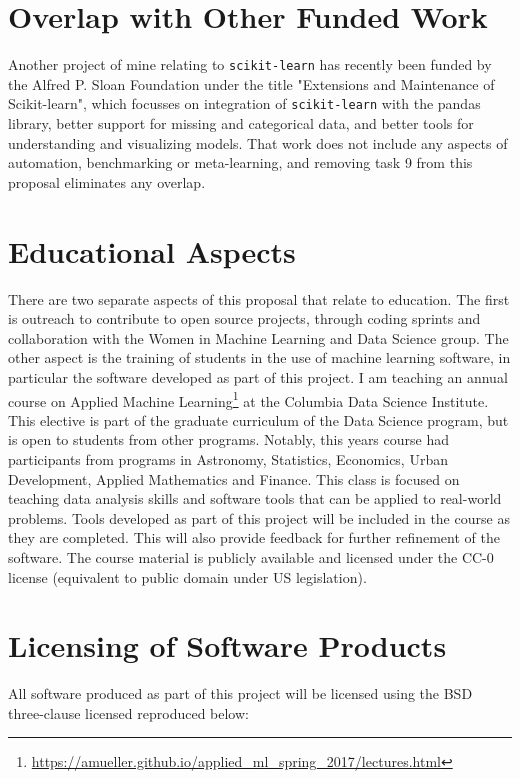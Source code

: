 \documentclass[11pt,letterpaper]{article}
\newcommand{\sklearn}[0]{\texttt{scikit-learn}\xspace}                    %
\begin{document}
\section{Overlap with Other Funded Work}
Another project of mine relating to \sklearn has recently been funded by the
Alfred P. Sloan Foundation under the title "Extensions and Maintenance of
Scikit-learn", which focusses on integration of \sklearn with the pandas
library, better support for missing and categorical data, and better tools for
understanding and visualizing models. That work does not include any aspects of
automation, benchmarking or meta-learning, and removing task 9 from this
proposal eliminates any overlap.
\enlargethispage{20pt}
\section{Educational Aspects}
There are two separate aspects of this proposal that relate to education. The first is outreach
to contribute to open source projects, through coding sprints and collaboration
with the Women in Machine Learning and Data Science group.
The other aspect is the training of students in the use of machine learning software,
in particular the software developed as part of this project.
I am teaching an annual course on Applied Machine
Learning\footnote{\url{https://amueller.github.io/applied_ml_spring_2017/lectures.html}}
at the Columbia Data Science Institute. This elective is part of the graduate
curriculum of the Data Science program, but is open to students from other programs.
Notably, this years course had participants from programs in Astronomy, Statistics,
Economics, Urban Development, Applied Mathematics and Finance.
This class is focused on teaching data analysis skills and software tools that
can be applied to real-world problems. Tools developed as part of this project
will be included in the course as they are completed. This will also provide
feedback for further refinement of the software.
The course material is publicly available and licensed under the CC-0 license
(equivalent to public domain under US legislation).

\section{Licensing of Software Products}
All software produced as part of this project will be licensed using the BSD three-clause
licensed reproduced below:
\end{document}
